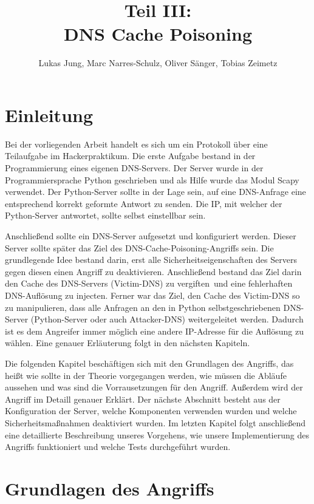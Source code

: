 \documentclass[10pt,a4paper]{article}
\author{Lukas Jung, Marc Narres-Schulz, Oliver Sänger, Tobias Zeimetz}
\title{Teil III: \\DNS Cache Poisoning}
\begin{document}
\maketitle
\newpage

\section{Einleitung}
Bei der vorliegenden Arbeit handelt es sich um ein Protokoll über eine Teilaufgabe im \glqq Hackerpraktikum\grqq. Die erste Aufgabe bestand in der Programmierung eines eigenen DNS-Servers. Der Server wurde in der Programmiersprache Python geschrieben und als Hilfe wurde das Modul Scapy verwendet. Der Python-Server sollte in der Lage sein, auf eine DNS-Anfrage eine entsprechend korrekt geformte Antwort zu senden. Die IP, mit welcher der Python-Server antwortet, sollte selbst einstellbar sein.

Anschließend sollte ein DNS-Server aufgesetzt und konfiguriert werden. Dieser Server sollte später das Ziel des DNS-Cache-Poisoning-Angriffs sein. Die grundlegende Idee bestand darin, erst alle Sicherheitseigenschaften des Servers gegen diesen einen Angriff zu deaktivieren. Anschließend bestand das Ziel darin den Cache des DNS-Servers (Victim-DNS) zu \glqq vergiften\grqq \ und eine fehlerhaften DNS-Auflösung zu injecten. Ferner war das Ziel, den Cache des Victim-DNS so zu manipulieren, dass alle Anfragen an den in Python selbstgeschriebenen DNS-Server (Python-Server oder auch Attacker-DNS) weitergeleitet werden. Dadurch ist es dem Angreifer immer möglich eine andere IP-Adresse für die Auflösung zu wählen. Eine genauer Erläuterung folgt in den nächsten Kapiteln.

Die folgenden Kapitel beschäftigen sich mit den Grundlagen des Angriffs, das heißt wie sollte in der Theorie vorgegangen werden, wie müssen die Abläufe aussehen und was sind die Vorrausetzungen für den Angriff. Außerdem wird der Angriff im Detaill genauer Erklärt. Der nächste Abschnitt besteht aus der Konfiguration der Server, welche Komponenten verwenden wurden und welche Sicherheitsmaßnahmen deaktiviert wurden. Im letzten Kapitel folgt anschließend eine detaillierte Beschreibung unseres Vorgehens, wie unsere Implementierung des Angriffs funktioniert und welche Tests durchgeführt wurden.

\section{Grundlagen des Angriffs}
\end{document}
